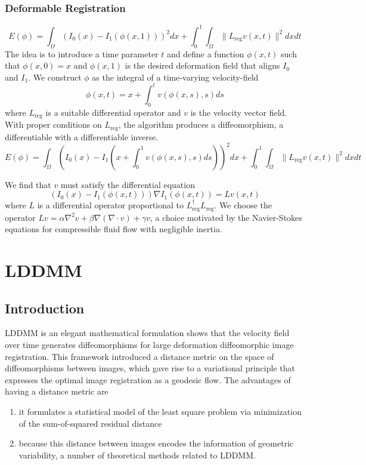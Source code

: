 \documentclass{article}
\theoremstyle{definition}
\theoremstyle{plain}
\begin{document}
\subsubsection{Deformable Registration}
\begin{equation*}
    E(\phi)=\int_\Omega(I_0(x)-I_1(\phi(x,1)))^2dx+\int^1_0\int_\Omega\|L_{\operatorname{reg}}v(x,t)\|^2dxdt
\end{equation*}
The idea is to introduce a time parameter $t$ and define a function $\phi(x,t)$ such that $\phi(x,0)=x$ and $\phi(x,1)$ is the desired deformation field that aligns $I_0$ and $I_1$. We construct $\phi$ as the integral of a time-varying velocity-field
\begin{equation*}
    \phi(x,t)=x+\int^t_0v(\phi(x,s),s)ds
\end{equation*}
where $L_{\operatorname{reg}}$ is a suitable differential operator and $v$ is the velocity vector field. With proper conditions on $L_{\operatorname{reg}}$, the algorithm produces a diffeomorphism, a differentiable with a differentiable inverse.
\begin{equation*}
    E(\phi)=\int_\Omega\left(I_0(x)-I_1\left(x+\int^1_0v(\phi(x,s),s)ds\right)\right)^2dx+\int^1_0\int_\Omega\|L_{\operatorname{reg}}v(x,t)\|^2dxdt
\end{equation*}

We find that $v$ must satisfy the differential equation
\begin{equation*}
    (I_0(x)-I_1(\phi(x,t)))\nabla I_1(\phi(x,t))=Lv(x,t)
\end{equation*}
where $L$ is a differential operator proportional to $L_{\operatorname{reg}}^\dagger L_{\operatorname{reg}}$. We choose the operator $Lv=\alpha\nabla^2v+\beta\nabla(\nabla\cdot v)+\gamma v$, a choice motivated by the Navier-Stokes equations for compressible fluid flow with negligible inertia.

\newpage
\section{LDDMM\cite{beg,tang}}
\subsection{Introduction}
LDDMM is an elegant mathematical formulation shows that the velocity field over time generates diffeomorphisms for large deformation diffeomorphic image registration. This framework introduced a distance metric on the space of diffeomorphisms between images, which gave rise to a variational principle that expresses the optimal image registration as a geodesic flow. The advantages of having a distance metric are
\begin{enumerate}
    \item it formulates a statistical model of the least square problem via minimization of the sum-of-squared residual distance
    \item because this distance between images encodes the information of geometric variability, a number of theoretical methods related to LDDMM.
\end{enumerate}
\end{document}
